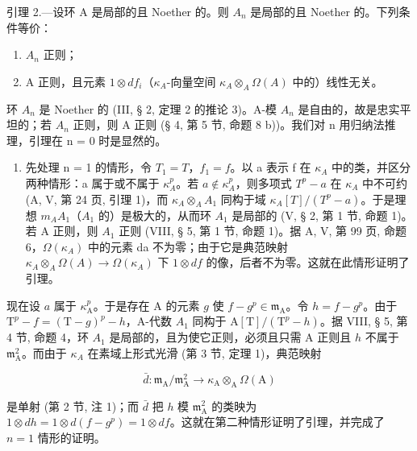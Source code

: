 引理 2.—设环 A 是局部的且 Noether 的。则 \(A_{n}\) 是局部的且 Noether 的。下列条件等价：

\begin{enumerate}
\def\labelenumi{(\roman{enumi})}
\item
  \(A_{n}\) 正则；
\item
  A 正则，且元素 \(1 \otimes df_{i}\)（\(\kappa_{A}\)-向量空间 \(\kappa_{A} \otimes_{A} \Omega(A)\) 中的）线性无关。
\end{enumerate}

环 \(A_{n}\) 是 Noether 的 (III, § 2, 定理 2 的推论 3)。A-模 \(A_{n}\) 是自由的，故是忠实平坦的；若 \(A_{n}\) 正则，则 A 正则 (§ 4, 第 5 节, 命题 8 b))。我们对 n 用归纳法推理，引理在 n = 0 时是显然的。

\begin{enumerate}
\def\labelenumi{\Alph{enumi})}
\tightlist
\item
  先处理 n = 1 的情形，令 \(T_{1} = T\)，\(f_{1} = f\)。以 a 表示 f 在 \(\kappa_{A}\) 中的类，并区分两种情形：a 属于或不属于 \(\kappa_{A}^{p}\)。若 \(a \notin \kappa_{A}^{p}\)，则多项式 \(T^{p} - a\) 在 \(\kappa_{A}\) 中不可约 (A, V, 第 24 页, 引理 1)，而 \(\kappa_{A} \otimes_{A} A_{1}\) 同构于域 \(\kappa_{A}[T]/(T^{p} - a)\)。于是理想 \(m_{A}A_{1}\)（\(A_{1}\) 的）是极大的，从而环 \(A_{1}\) 是局部的 (V, § 2, 第 1 节, 命题 1)。若 A 正则，则 \(A_{1}\) 正则 (VIII, § 5, 第 1 节, 命题 1)。据 A, V, 第 99 页, 命题 6，\(\Omega(\kappa_{A})\) 中的元素 da 不为零；由于它是典范映射 \(\kappa_{A} \otimes_{A} \Omega(A) \to \Omega(\kappa_{A})\) 下 \(1 \otimes df\) 的像，后者不为零。这就在此情形证明了引理。
\end{enumerate}

现在设 \(a\) 属于 \(\kappa_{\mathrm{A}}^{p}\)。于是存在 A 的元素 \(g\) 使 \(f - g^{p} \in \mathfrak{m}_{\mathrm{A}}\)。令 \(h = f - g^{p}\)。由于 \(\mathrm{T}^{p} - f = (\mathrm{T} - g)^{p} - h\)，A-代数 \(A_{1}\) 同构于 \(\mathrm{A}[\mathrm{T}] / (\mathrm{T}^{p} - h)\)。据 VIII, § 5, 第 4 节, 命题 4，环 \(A_{1}\) 是局部的，且为使它正则，必须且只需 A 正则且 \(h\) 不属于 \(\mathfrak{m}_{\mathrm{A}}^{2}\)。而由于 \(\kappa_{A}\) 在素域上形式光滑 (第 3 节, 定理 1)，典范映射

\[
\bar {d}: \mathfrak {m} _ {\mathrm{A}} / \mathfrak {m} _ {\mathrm{A}} ^ {2} \to \kappa_ {\mathrm{A}} \otimes_ {\mathrm{A}} \Omega (\mathrm{A})
\]

是单射 (第 2 节, 注 1)；而 \(\bar{d}\) 把 \(h\) 模 \(\mathfrak{m}_{\mathrm{A}}^{2}\) 的类映为 \(1 \otimes dh = 1 \otimes d(f - g^{p}) = 1 \otimes df\)。这就在第二种情形证明了引理，并完成了 \(n = 1\) 情形的证明。

